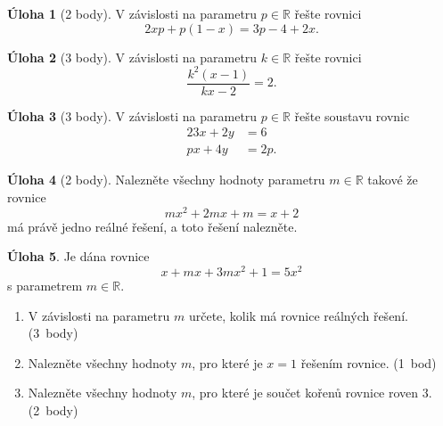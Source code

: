 \documentclass[12pt,a5paper]{extarticle}
\newcommand{\R}{\mathbb{R}}
\def\tisk{%
\newbox\shipouthackbox
\pdfpagewidth=2\pdfpagewidth
\let\oldshipout=\shipout
\def\shipout{\afterassignment\zdvojtmp \setbox\shipouthackbox=}%
\def\zdvojtmp{\aftergroup\zdvoj}%
\def\zdvoj{%
    \oldshipout\vbox{\hbox{%
        \copy\shipouthackbox
        \hskip\dimexpr .5\pdfpagewidth-\wd\shipouthackbox\relax
        \box\shipouthackbox
    }}%
}}%
\theoremstyle{definition}
\newtheorem{uloha}{Úloha}
\begin{document}

\begin{uloha}[2 body]
V závislosti na parametru $p \in \R$ řešte rovnici
\[ 2 x p + p (1 - x) = 3 p - 4 + 2 x. \]
\end{uloha}


\begin{uloha}[3 body]
V závislosti na parametru $k \in \R$ řešte rovnici
\[ \frac{k^2(x-1)}{kx - 2} = 2. \]
\end{uloha}


\begin{uloha}[3 body]
V závislosti na parametru $p \in \R$ řešte soustavu rovnic
\useshortskip
\begin{alignat*}{2}
3x + 2y &= 6 \\
px + 4y &= 2p.
\end{alignat*}
\end{uloha}


\begin{uloha}[2 body]
Nalezněte všechny hodnoty parametru $m \in \R$ takové že rovnice
\[ mx^2 + 2mx + m = x + 2 \]
má právě jedno reálné řešení, a toto řešení nalezněte.
\end{uloha}


\begin{uloha}
Je dána rovnice
\[ x + m x + 3 m x^2 + 1 = 5 x^2 \]
s parametrem $m \in \R$.
\begin{enumerate}
    \item V závislosti na parametru $m$ určete, kolik má rovnice reálných řešení. (3~body)
    \item Nalezněte všechny hodnoty $m$, pro které je $x = 1$ řešením rovnice.  (1~bod)
    \item Nalezněte všechny hodnoty $m$, pro které je součet kořenů rovnice roven $3$. (2~body)
\end{enumerate}
\end{uloha}
\end{document}
